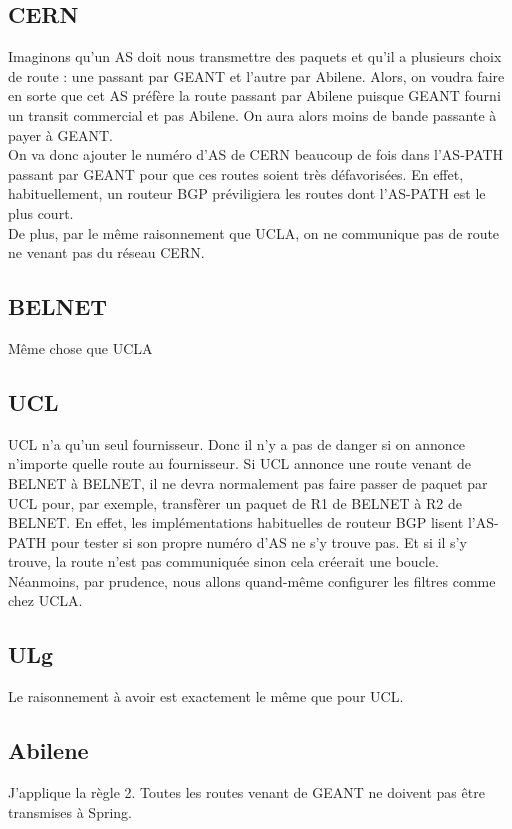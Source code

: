 \documentclass[a4paper, 12pt]{article}
\begin{document}
\subsection{CERN}
Imaginons qu'un AS doit nous transmettre des paquets et qu'il a plusieurs choix de route : une passant par GEANT et l'autre par Abilene.
Alors, on voudra faire en sorte que cet AS préfère la route passant par Abilene puisque GEANT fourni un transit commercial et pas Abilene.
On aura alors moins de bande passante à payer à GEANT.
\\

On va donc ajouter le numéro d'AS de CERN beaucoup de fois dans l'AS-PATH passant par GEANT pour que ces routes soient très défavorisées.
En effet, habituellement, un routeur BGP préviligiera les routes dont l'AS-PATH est le plus court. 
\\

De plus, par le même raisonnement que UCLA, on ne communique pas de route ne venant pas du réseau CERN.

\subsection{BELNET}
Même chose que UCLA

\subsection{UCL}
UCL n'a qu'un seul fournisseur. Donc il n'y a pas de danger si on annonce n'importe quelle route au fournisseur.
Si UCL annonce une route venant de BELNET à BELNET, il ne devra normalement pas faire passer de paquet par UCL pour, par exemple, transfèrer un paquet de R1 de BELNET à R2 de BELNET.
En effet, les implémentations habituelles de routeur BGP lisent l'AS-PATH pour tester si son propre numéro d'AS ne s'y trouve pas.
Et si il s'y trouve, la route n'est pas communiquée sinon cela créerait une boucle.
Néanmoins, par prudence, nous allons quand-même configurer les filtres comme chez UCLA.

\subsection{ULg}
Le raisonnement à avoir est exactement le même que pour UCL.

\subsection{Abilene}
J'applique la règle 2. Toutes les routes venant de GEANT ne doivent pas être transmises à Spring.
\end{document}
